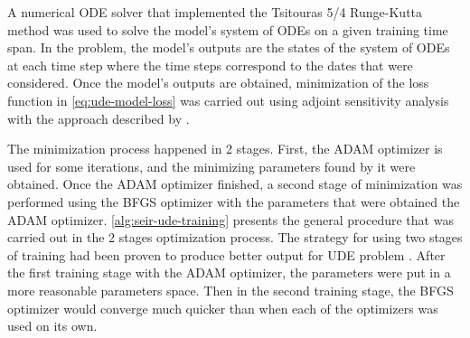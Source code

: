 A numerical \gls{ODE} solver that implemented the Tsitouras 5/4 Runge-Kutta method \cite{tsitourasRungeKuttaPairs2011} was used to solve the model's system of \glspl{ODE} on a given training time span.
In the problem, the model's outputs are the states of the system of \glspl{ODE} at each time step where the time steps correspond to the dates that were considered.
Once the model's outputs are obtained, minimization of the loss function in \autoref{eq:ude-model-loss} was carried out using adjoint sensitivity analysis \cite{maComparisonAutomaticDifferentiation2021} with the approach described by \citeauthor{rackauckasUniversalDifferentialEquations2020} \cite{rackauckasUniversalDifferentialEquations2020}.

The minimization process happened in 2 stages.
First, the ADAM optimizer \cite{kingmaAdamMethodStochastic2017} is used for some iterations, and the minimizing parameters found by it were obtained.
Once the ADAM optimizer finished, a second stage of minimization was performed using the BFGS optimizer \cite{broydenConvergenceClassDoublerank1970, fletcherNewApproachVariable1970, goldfarbFamilyVariablemetricMethods1970, shannoConditioningQuasiNewtonMethods1970} with the parameters that were obtained the ADAM optimizer.
\autoref{alg:seir-ude-training} presents the general procedure that was carried out in the 2 stages optimization process.
The strategy for using two stages of training had been proven to produce better output for \gls{UDE} problem \cite{rackauckasUniversalDifferentialEquations2020}.
After the first training stage with the ADAM optimizer, the parameters were put in a more reasonable parameters space.
Then in the second training stage, the BFGS optimizer would converge much quicker than when each of the optimizers was used on its own.

